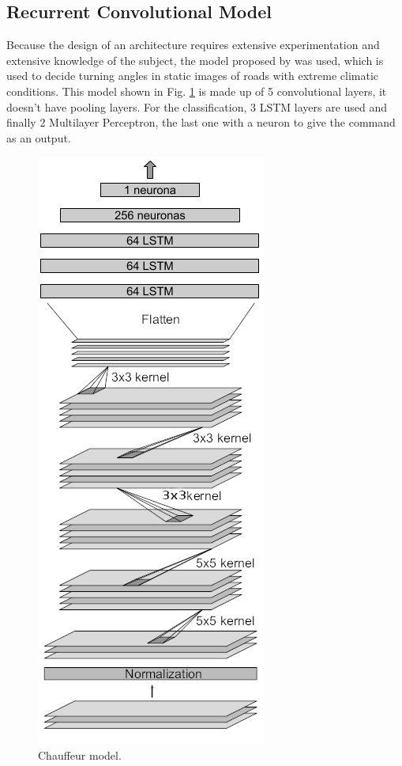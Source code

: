\documentclass[conference]{IEEEtran}
\begin{document}
\subsection{Recurrent Convolutional Model}
Because the design of an architecture requires extensive experimentation and extensive knowledge of the subject, the model proposed by \cite{tian2018deeptest} was used, which is used to decide turning angles in static images of roads with extreme climatic conditions. This model shown in Fig. \ref{fig:chauffeur} is made up of 5 convolutional layers, it doesn't have pooling layers. For the classification, 3 LSTM layers are used and finally 2 Multilayer Perceptron, the last one with a neuron to give the command as an output.

\begin{figure}[h]
	\centerline{\includegraphics[scale=0.33]{img/chauffeur}}
	\caption{Chauffeur model.}
	\label{fig:chauffeur}
\end{figure}
\end{document}
